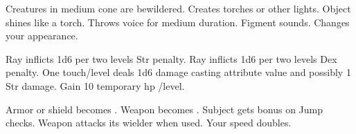 \begin{swspelllist}
   Creatures in medium cone are bewildered.
   Creates torches or other lights.
   Object shines like a torch.
   Throws voice for medium duration.
   Figment sounds.
   Changes your appearance.

   Ray inflicts 1d6  per two levels Str penalty.
   Ray inflicts 1d6  per two levels Dex penalty.
   One touch/level deals 1d6 damage \add casting attribute value and possibly 1 Str damage.
   Gain 10 temporary hp /level.

   Armor or shield becomes .
   Weapon becomes .
   Subject gets bonus on Jump checks.
   Weapon attacks its wielder when used.
   Your speed doubles.
\end{swspelllist}

